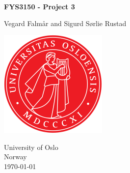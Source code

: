 \documentclass[reprint, english,notitlepage,nofootinbib]{revtex4-1}  %
\begin{document}
\begin{titlepage}
	\begin{center}
	\textbf{FYS3150 - Project 3}

	\vspace{0.2cm}
	Vegard Falmår and Sigurd Sørlie Rustad

	\vspace{0.5cm}
	\includegraphics[scale=0.5]{../../pictures/UIO}
	\vspace{0.8cm}

	University of Oslo\\
	Norway\\
	\today	\\
	\end{center}
	\tableofcontents
	\clearpage
\end{titlepage}
\end{document}
